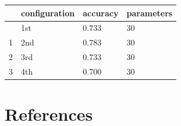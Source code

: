 \documentclass[
  13pt,
  a4paper,
  DIV=11,
  numbers=noendperiod]{scrreprt}
\begin{document}
\begin{longtable}[]{@{}llll@{}}
\toprule\noalign{}
& configuration & accuracy & parameters \\
\midrule\noalign{}
\endhead
\bottomrule\noalign{}
\endlastfoot
0 & 1st & 0.733 & 30 \\
1 & 2nd & 0.783 & 30 \\
2 & 3rd & 0.733 & 30 \\
3 & 4th & 0.700 & 30 \\
\end{longtable}


\chapter*{References}\label{references}

\end{document}
